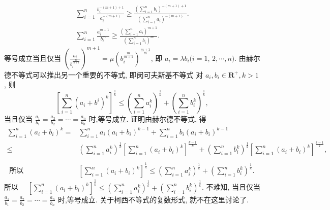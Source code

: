 $$
\begin{gathered}
\sum_{i=1}^n \frac{b_i^{-(m+1)+1}}{a_i^{-(m+1)}} \geqslant \frac{\left(\sum_{i=1}^n b_i\right)^{-(m+1)+1}}{\left(\sum_{i=1}^n a_i\right)^{-(m+1)}} . \\
\sum_{i=1}^n \frac{a_i^{m+1}}{b_i^m} \geqslant \frac{\left(\sum_{i=1}^n a_i\right)^{m+1}}{\left(\sum_{i=1}^n b_i\right)^m} .
\end{gathered}
$$
等号成立当且仅当 $\left(\frac{a_i}{b_i^{\frac{m}{m+1}}}\right)^{m+1}=\mu\left(b_i^{\frac{m}{m+1}}\right)^{\frac{m+1}{m}}$, 即 $a_i=\lambda b_i(i=1$, $2, \cdots, n)$.
由赫尔德不等式可以推出另一个重要的不等式, 即闵可夫斯基不等式 对 $a_i, b_i \in \mathbf{R}^{+}, k>1$, 则
$$
\left[\sum_{i=1}^n\left(a_i+b^i\right)^k\right]^{\frac{1}{k}} \leqslant\left(\sum_{i=1}^n a_i^k\right)^{\frac{1}{k}}+\left(\sum_{i=1}^n b_i^k\right)^{\frac{1}{k}},
$$
当且仅当 $\frac{a_1}{b_1}=\frac{a_2}{b_2}=\cdots=\frac{a_n}{b_n}$ 时,等号成立.
证明由赫尔德不等式, 得
$$
\begin{aligned}
\sum_{i=1}^n\left(a_i+b_i\right)^k= & \sum_{i=1}^n a_i\left(a_i+b_i\right)^{k-1}+\sum_{i=1}^n b_i\left(a_i+b_i\right)^{k-1} \\
\leqslant & \left(\sum_{i=1}^n a_i^k\right)^{\frac{1}{k}}\left[\sum_{i=1}^n\left(a_i+b_i\right)^k\right]^{\frac{k-1}{k}}+\left(\sum_{i=1}^n b_i^k\right)^{\frac{1}{k}}\left[\sum_{i=1}^n\left(a_i+b_i\right)^k\right]^{\frac{k-1}{k}}, \\
& \\
\text { 所以 } & {\left[\sum_{i=1}^n\left(a_i+b_i\right)^k\right]^{\frac{1}{k}} \leqslant\left(\sum_{i=1}^n a_i^k\right)^{\frac{1}{k}}+\left(\sum_{i=1}^n b_i^k\right)^{\frac{1}{k}} . }
\end{aligned}
$$
所以 $\quad\left[\sum_{i=1}^n\left(a_i+b_i\right)^k\right]^{\frac{1}{k}} \leqslant\left(\sum_{i=1}^n a_i^k\right)^{\frac{1}{k}}+\left(\sum_{i=1}^n b_i^k\right)^{\frac{1}{k}}$.
不难知, 当且仅当 $\frac{a_1}{b_1}=\frac{a_2}{b_2}=\cdots=\frac{a_n}{b_n}$ 时,等号成立.
关于柯西不等式的复数形式, 就不在这里讨论了.


